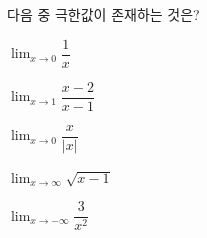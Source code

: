 다음 중 극한값이 존재하는 것은?
\begin{choices32}{\rule[-3ex]{0pt}{8ex}$\displaystyle\lim_{x\to 0}\dfrac{1}{x}$}{\rule[-3ex]{0pt}{8ex}$\displaystyle\lim_{x\to 1}\dfrac{x-2}{x-1}$}{\rule[-3ex]{0pt}{8ex}$\displaystyle\lim_{x\to 0}\dfrac{x}{|x|}$}{\rule[-3ex]{0pt}{8ex}$\displaystyle\lim_{x\to\infty}\sqrt{x-1}$}{\rule[-3ex]{0pt}{8ex}$\displaystyle\lim_{x\to -\infty}\dfrac{3}{x^2}$}\end{choices32}
